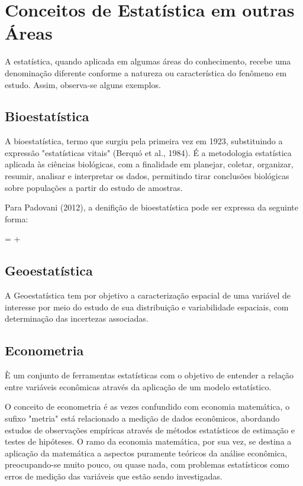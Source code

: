 \section{Conceitos de Estatística em outras Áreas}

A estatística, quando aplicada em algumas áreas do conhecimento, recebe uma denominação diferente conforme a natureza ou característica do fenômeno em estudo. Assim, observa-se alguns exemplos.

\subsection{Bioestatística}

A bioestatística, termo que surgiu pela primeira vez em 1923, substituindo a expressão "estatísticas vitais" (Berquó et al., 1984). É a metodologia estatística aplicada às ciências biológicas, com a finalidade em planejar, coletar, organizar, resumir, analisar e interpretar os dados, permitindo tirar conclusões biológicas sobre populações a partir do estudo de amostras.\vskip0.3cm

Para Padovani (2012), a denifição de bioestatística pode ser expressa da seguinte forma:

\begin{center}
 =  + 
\end{center}

\subsection{Geoestatística} 

A Geoestatística tem por objetivo a caracterização espacial de uma variável de interesse por meio do
estudo de sua distribuição e variabilidade espaciais, com determinação das incertezas associadas.\vskip0.3cm

\subsection{Econometria} 

È um conjunto de ferramentas estatísticas com o objetivo de entender a relação entre variáveis econômicas através da aplicação de um modelo estatístico.\vskip0.3cm

O conceito de econometria é as vezes confundido com economia matemática, o sufixo "metria" está relacionado a medição de dados econômicos, abordando estudos de observações empíricas através de métodos estatísticos de estimação e testes de hipóteses. O ramo da economia matemática, por sua vez, se destina a aplicação da matemática a aspectos puramente teóricos da análise econômica, preocupando-se muito pouco, ou quase nada, com problemas estatísticos como erros de medição das variáveis que estão sendo investigadas.\vskip0.3cm

